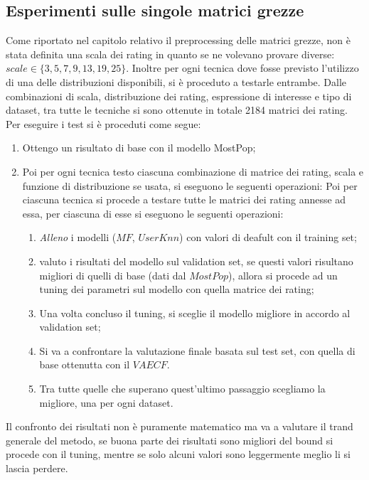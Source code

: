 \subsection{Esperimenti sulle singole matrici grezze}
Come riportato nel capitolo relativo il preprocessing delle matrici grezze, non è stata definita una scala dei rating in quanto se ne volevano provare diverse: $scale \in \{3, 5, 7, 9, 13, 19, 25\}$.
Inoltre per ogni tecnica dove fosse previsto l'utilizzo di una delle distribuzioni disponibili, si è proceduto a testarle entrambe.
Dalle combinazioni di scala, distribuzione dei rating, espressione di interesse e tipo di dataset, tra tutte le tecniche si sono ottenute in totale 2184 matrici dei rating.
Per eseguire i test si è proceduti come segue:
\begin{enumerate}
    \item Ottengo un risultato di base con il modello MostPop;
    \item Poi per ogni tecnica testo ciascuna combinazione di matrice dei rating, scala e funzione di distribuzione se usata, si eseguono le seguenti operazioni:
    Poi per ciascuna tecnica si procede a testare tutte le matrici dei rating annesse ad essa, per ciascuna di esse si eseguono le seguenti operazioni:
    \begin{enumerate}
        \item \textit{Alleno} i modelli ($MF$, $UserKnn$) con valori di deafult con il training set;
        \item valuto i risultati del modello sul validation set, se questi valori risultano migliori di quelli di base (dati dal $MostPop$), allora si procede ad un tuning dei parametri sul modello con quella matrice dei rating;
        \item Una volta concluso il tuning, si sceglie il modello migliore in accordo al validation set;
        \item Si va a confrontare la valutazione finale basata sul test set, con quella di base ottenutta con il $VAECF$.
        \item Tra tutte quelle che superano quest'ultimo passaggio scegliamo la migliore, una per ogni dataset.
    \end{enumerate}
\end{enumerate}

Il confronto dei risultati non è puramente matematico ma va a valutare il trand generale del metodo, se buona parte dei risultati sono migliori del bound si procede con il tuning, mentre se solo alcuni valori sono leggermente meglio li si lascia perdere.

